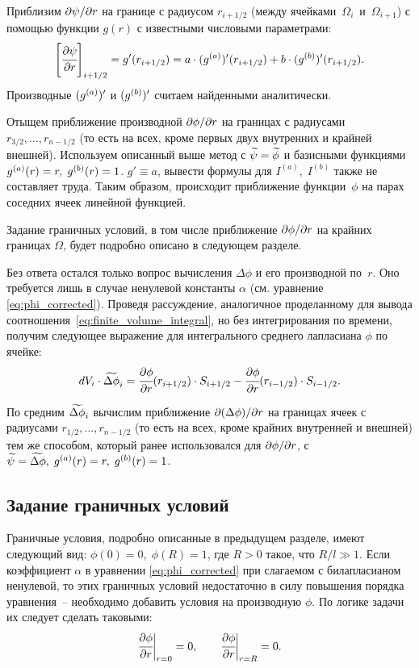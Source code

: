 Приблизим $\partial \psi / \partial r$ на границе с радиусом $r_{i + 1/2}$ (между ячейка\forcehyphenation ми~$\Omega_i$~и~$\Omega_{i + 1}$) с помощью функции $g(r)$ с известными числовыми параметрами:
$$\left[ \cfrac{\partial \psi}{\partial r} \right]_{i + 1/2} = g'(r_{i + 1/2}) = a \cdot ({g^{(a)}})'(r_{i + 1/2}) + b \cdot ({g^{(b)}})'(r_{i + 1/2}) {\text{.}}$$
Производные $({g^{(a)}})'$ и $({g^{(b)}})'$ считаем найденными аналитически.

Отыщем приближение производной $\partial \phi / \partial r$ на границах с радиуса\forcehyphenation ми~$r_{3/2},..., r_{n - 1/2}$ (то есть на всех, кроме первых двух внутренних и крайней внешней). Используем описанный выше метод с ${\widetilde{\psi}} = {\widetilde{\phi}}$ и базисными функциями ${g^{(a)}}(r) = r, \; {g^{(b)}}(r) = 1$. $g' \equiv a$, вывести формулы для $I^{(a)}, \; I^{(b)}$ также не составляет труда. Таким образом, происходит приближение функции~$\phi$ на парах соседних ячеек линейной функцией.

Задание граничных условий, в том числе приближение $\partial \phi / \partial r$ на крайних границах $\Omega$, будет подробно описано в следующем разделе.

Без ответа остался только вопрос вычисления $\Delta \phi$ и его производной по~$r$. Оно требуется лишь в случае ненулевой константы $\alpha$ (см. уравнение \eqref{eq:phi_corrected}). Проведя рассуждение, аналогичное проделанному для вывода соотноше\forcehyphenation ния~\eqref{eq:finite_volume_integral}, но без интегрирования по времени, получим следующее выражение для интегрального среднего лапласиана $\phi$ по ячейке:
$$dV_i \cdot {\widetilde{\Delta \phi}}_i = \cfrac{\partial \phi}{\partial r} (r_{i + 1/2}) \cdot S_{i + 1/2} - \cfrac{\partial \phi}{\partial r} (r_{i - 1/2}) \cdot S_{i - 1/2} {\text{.}}$$

По средним ${\widetilde{\Delta \phi}}_i$ вычислим приближение $\partial (\Delta \phi) / \partial r$ на границах ячеек с радиусами $r_{1/2}, ..., r_{n - 1/2}$ (то есть на всех, кроме крайних внутренней и внешней) тем же способом, который ранее использовался для $\partial \phi / \partial r$, с $\avpsi \hm = \avlaplphi, \; \ga(r) = r, \; \gb(r) = 1$.


\subsection{Задание граничных условий}

Граничные условия, подробно описанные в предыдущем разделе, имеют следующий вид: $\phi(0) = 0, \; \phi(R) = 1$, где $R > 0$ такое, что $R / l \gg 1$. Если коэффициент $\alpha$ в уравнении \eqref{eq:phi_corrected} при слагаемом с билапласианом ненулевой, то этих граничных условий недостаточно в силу повышения порядка уравнения~-- необходимо добавить условия на производную $\phi$. По логике задачи их следует сделать таковыми:
$$\cfrac{\partial \phi}{\partial r} \bigg|_{r = 0} = 0, \qquad \cfrac{\partial \phi}{\partial r} \bigg|_{r = R} = 0 {\text{.}}$$


